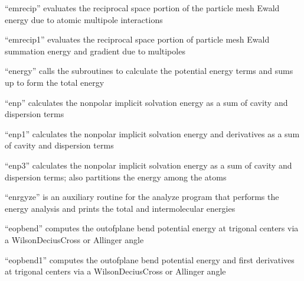 \documentclass[letterpaper,11pt,english]{sphinxmanual}
\begin{document}
\sphinxAtStartPar
{}

\sphinxAtStartPar
“emrecip” evaluates the reciprocal space portion of the particle mesh Ewald energy due to atomic multipole interactions

\sphinxAtStartPar
{}

\sphinxAtStartPar
“emrecip1” evaluates the reciprocal space portion of particle mesh Ewald summation energy and gradient due to multipoles

\sphinxAtStartPar
{}

\sphinxAtStartPar
“energy” calls the subroutines to calculate the potential energy terms and sums up to form the total energy

\sphinxAtStartPar
{}

\sphinxAtStartPar
“enp” calculates the nonpolar implicit solvation energy as a sum of cavity and dispersion terms

\sphinxAtStartPar
{}

\sphinxAtStartPar
“enp1” calculates the nonpolar implicit solvation energy and derivatives as a sum of cavity and dispersion terms

\sphinxAtStartPar
{}

\sphinxAtStartPar
“enp3” calculates the nonpolar implicit solvation energy as a sum of cavity and dispersion terms; also partitions the energy among the atoms

\sphinxAtStartPar
{}

\sphinxAtStartPar
“enrgyze” is an auxiliary routine for the analyze program that performs the energy analysis and prints the total and intermolecular energies

\sphinxAtStartPar
{}

\sphinxAtStartPar
“eopbend” computes the out\sphinxhyphen{}of\sphinxhyphen{}plane bend potential energy at trigonal centers via a Wilson\sphinxhyphen{}Decius\sphinxhyphen{}Cross or Allinger angle

\sphinxAtStartPar
{}

\sphinxAtStartPar
“eopbend1” computes the out\sphinxhyphen{}of\sphinxhyphen{}plane bend potential energy and first derivatives at trigonal centers via a Wilson\sphinxhyphen{}Decius\sphinxhyphen{}Cross or Allinger angle
\end{document}
